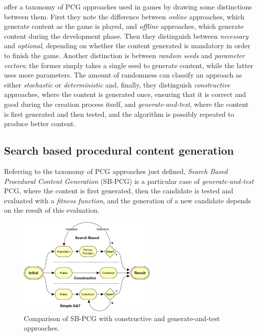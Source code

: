 \documentclass{Configuration_Files/PoliMi3i_thesis}
\begin{document}
 offer a taxonomy of PCG approaches used in games by drawing some distinctions between them. First they note the difference between \textit{online} approaches, which generate content as the game is played, and \textit{offline} approaches, which generate content during the development phase. Then they distinguish between \textit{necessary} and \textit{optional}, depending on whether the content generated is mandatory in order to finish the game. Another distinction is between \textit{random seeds} and \textit{parameter vectors}; the former simply takes a single seed to generate content, while the latter uses more parameters. The amount of randomness can classify an approach as either \textit{stochastic} or \textit{deterministic} and, finally, they distinguish \textit{constructive} approaches, where the content is generated once, ensuring that it is correct and good during the creation process itself, and \textit{generate-and-test}, where the content is first generated and then tested, and the algorithm is possibly repeated to produce better content. \cite{togelius_search-based_2010}

\subsection{Search based procedural content generation}
\label{subsec:search_based_pcg}
Referring to the taxonomy of PCG approaches just defined, \textit{Search Based Procedural Content Generation} (SB-PCG) is a particular case of \textit{generate-and-test} PCG, where the content is first generated, then the candidate is tested and evaluated with a \textit{fitness function}, and the generation of a new candidate depends on the result of this evaluation. \cite{togelius_search-based_2010}

\begin{figure}[H]
    \centering
    \includegraphics[width=0.6\textwidth]{Images/Togelius.png}
    \caption{Comparison of SB-PCG with constructive and generate-and-test approaches.}
    \label{fig:pcg}
\end{figure}
\end{document}
